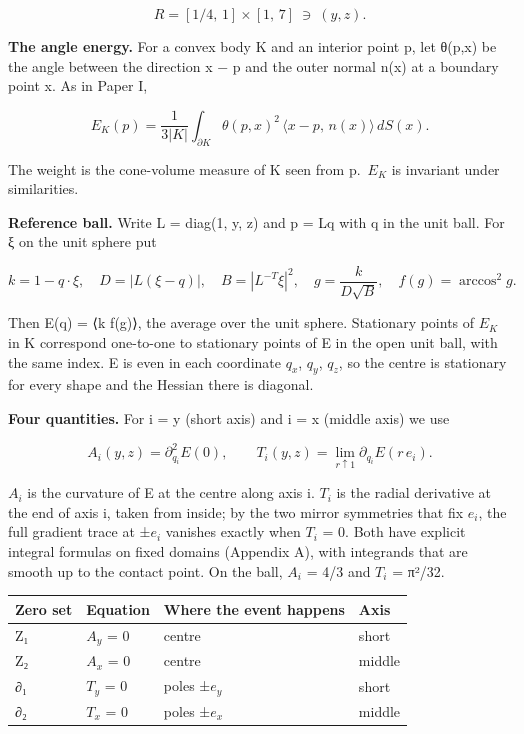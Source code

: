 \documentclass[
  11pt,
]{article}
\begin{document}
\[
R=[1/4,\,1]\times[1,\,7]\ \ni\ (y,z).
\]

\textbf{The angle energy.} For a convex body K and an interior point p,
let θ(p,x) be the angle between the direction x − p and the outer normal
n(x) at a boundary point x. As in Paper I,

\[
E_K(p)=\frac{1}{3|K|}\int_{\partial K}\theta(p,x)^2\,\langle x-p,\,n(x)\rangle\,dS(x).
\]

The weight is the cone-volume measure of K seen from p.~\(E_{K}\) is
invariant under similarities.

\textbf{Reference ball.} Write L = diag(1, y, z) and p = Lq with q in
the unit ball. For ξ on the unit sphere put

\[
k=1-q\cdot\xi,\quad D=|L(\xi-q)|,\quad B=|L^{-T}\xi|^2,\quad g=\frac{k}{D\sqrt{B}},\quad f(g)=\arccos^2 g .
\]

Then E(q) = ⟨k f(g)⟩, the average over the unit sphere. Stationary
points of \(E_{K}\) in K correspond one-to-one to stationary points of E
in the open unit ball, with the same index. E is even in each coordinate
\(q_{x}\), \(q_{y}\), \(q_{z}\), so the centre is stationary for every
shape and the Hessian there is diagonal.

\textbf{Four quantities.} For i = y (short axis) and i = x (middle axis)
we use

\[
A_i(y,z)=\partial_{q_i}^2E(0),\qquad T_i(y,z)=\lim_{r\uparrow 1}\partial_{q_i}E(r\,e_i).
\]

\(A_{i}\) is the curvature of E at the centre along axis i. \(T_{i}\) is
the radial derivative at the end of axis i, taken from inside; by the
two mirror symmetries that fix \(e_{i}\), the full gradient trace at
±\(e_{i}\) vanishes exactly when \(T_{i}\) = 0. Both have explicit
integral formulas on fixed domains (Appendix A), with integrands that
are smooth up to the contact point. On the ball, \(A_{i}\) = 4/3 and
\(T_{i}\) = π²/32.

\begin{longtable}[]{@{}llll@{}}
\toprule\noalign{}
Zero set & Equation & Where the event happens & Axis \\
\midrule\noalign{}
\endhead
\bottomrule\noalign{}
\endlastfoot
Z₁ & \(A_{y}\) = 0 & centre & short \\
Z₂ & \(A_{x}\) = 0 & centre & middle \\
∂₁ & \(T_{y}\) = 0 & poles ±\(e_{y}\) & short \\
∂₂ & \(T_{x}\) = 0 & poles ±\(e_{x}\) & middle \\
\end{longtable}
\end{document}

